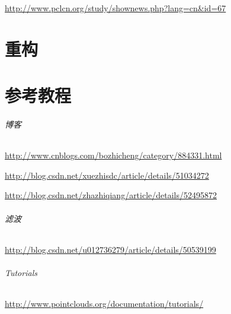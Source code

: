\documentclass[UTF8,a4paper,12pt]{ctexbook}
\begin{document}
	\url{http://www.pclcn.org/study/shownews.php?lang=cn&id=67}

\chapter{重构}

\chapter{参考教程}
	\subparagraph{博客} \url{http://www.cnblogs.com/bozhicheng/category/884331.html}
	
		\url{http://blog.csdn.net/xuezhisdc/article/details/51034272}
		
		\url{http://blog.csdn.net/zhazhiqiang/article/details/52495872}
	
	\subparagraph{滤波} \url{http://blog.csdn.net/u012736279/article/details/50539199}
	
	\subparagraph{Tutorials}\url{http://www.pointclouds.org/documentation/tutorials/}	    
\end{document}

